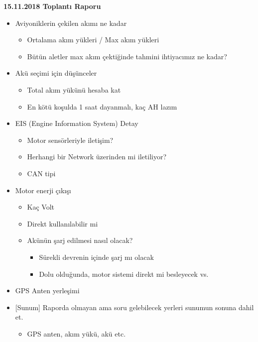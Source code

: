 \documentclass[a4paper,12pt]{article}
\begin{document}
	
\begin{center}
	\Large\textbf{15.11.2018 Toplantı Raporu}
	\end{center}





\begin{itemize}
	
	\item Aviyoniklerin çekilen akımı ne kadar 
		\begin{itemize}
			\item Ortalama akım yükleri / Max akım yükleri
			\item Bütün aletler max akım çektiğinde tahmini ihtiyacımız ne kadar?
		\end{itemize}
	\item Akü seçimi için düşünceler
			\begin{itemize}
				\item Total akım yükünü hesaba kat
				\item En kötü koşulda 1 saat dayanmalı, kaç AH lazım
			\end{itemize}
	\item EIS (Engine Information System) Detay
		\begin{itemize}
			\item Motor sensörleriyle iletişim?
			\item Herhangi bir Network üzerinden mi iletiliyor?
			\item CAN tipi
		\end{itemize}
	\item Motor enerji çıkışı
		\begin{itemize}
			\item Kaç Volt
			\item Direkt kullanılabilir mi
			\item Akünün şarj edilmesi nasıl olacak? 
				\begin{itemize}
					\item Sürekli devrenin içinde şarj mı olacak
					\item Dolu olduğunda, motor sistemi direkt mi besleyecek vs.
				\end{itemize}
		\end{itemize}
	\item GPS Anten yerleşimi		
		\vspace{1cm}
	
	\item {[Sunum]} Raporda olmayan ama soru gelebilecek yerleri sunumun sonuna dahil et.
		\begin{itemize}
			\item GPS anten, akım yükü, akü etc.			
		\end{itemize}				
	
	
\end{itemize}



\end{document}
